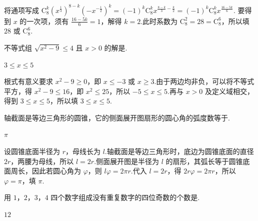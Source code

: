 \documentclass[UTF8,a4paper,oneside,11pt]{ctexbook}
\begin{document}
\begin{solution}
将通项写成
\(\mathrm C_8^k\left(x^{\frac{1}{3}}\right)^{8-k}\left(-x^{-\frac{1}{2}}\right)^k=(-1)^k\mathrm C_8^k x^{\frac{8-k}{3}-\frac{k}{2}}=(-1)^k\mathrm C_8^k x^{\frac{16-5k}{6}}\).
要得到 \(x\) 的一次项，须有 \(\frac{16-5k}{6}=1\)，解得 \(k=2\).此时系数为
\(\mathrm C_8^2=28=\mathrm C_8^6\)，所以填 \(28\) 或 \(\mathrm C_8^6\).
\end{solution}

\begin{problem}

不等式组 \(\sqrt{x^2-9}\leqslant 4\) 且 \(x>0\) 的解是\fillinblank{}.
\end{problem}

\begin{answer}
\(3\leqslant x\leqslant 5\)
\end{answer}

\begin{solution}
根式有意义要求 \(x^2-9\geqslant0\)，即 \(x\leqslant-3\) 或 \(x\geqslant3\).由于两边均非负，可以将不等式平方，得
\(x^2-9\leqslant16\)，即 \(x^2\leqslant25\)，所以 \(-5\leqslant x\leqslant5\).再与 \(x>0\) 及定义域相交，得到
\(3\leqslant x\leqslant5\)，所以填 \(3\leqslant x\leqslant5\).
\end{solution}

\begin{problem}

轴截面是等边三角形的圆锥，它的侧面展开图扇形的圆心角的弧度数等于\fillinblank{}.
\end{problem}

\begin{answer}
\(\pi\)
\end{answer}

\begin{solution}
设圆锥底面半径为 \(r\)，母线长为 \(l\).轴截面是等边三角形时，底边为圆锥底面的直径 \(2r\)，两腰为母线，所以 \(l=2r\).侧面展开图是半径为 \(l\) 的扇形，其弧长等于圆锥底面周长，因此若圆心角为 \(\varphi\)，则
\(l\varphi=2\pi r\).代入 \(l=2r\)，得 \(2r\varphi=2\pi r\)，所以 \(\varphi=\pi\)，填 \(\pi\).
\end{solution}

\begin{problem}

用 \(1\)，\(2\)，\(3\)，\(4\) 四个数字组成没有重复数字的四位奇数的个数是\fillinblank{}.
\end{problem}

\begin{answer}
\(12\)
\end{answer}
\end{document}
